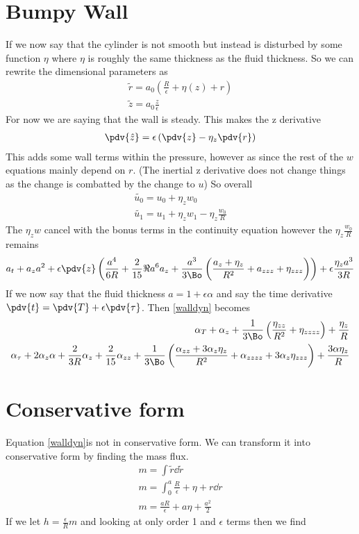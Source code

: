 \documentclass[12pt]{article}
\begin{document}
\section{Bumpy Wall}

If we now say that the cylinder is not smooth but instead is disturbed by some function $\eta$ where $\eta$ is roughly the same thickness as the fluid thickness. So we can rewrite the dimensional parameters as
\begin{align}
\tilde r = a_0\left(\frac{R}{\epsilon}+\eta(z) +r\right)\\
\tilde z = a_0\frac{ z}{\epsilon}
\end{align}
For now we are saying that the wall is steady.
This makes the z derivative
\begin{align}
\pdv{\hat{z}} = \epsilon\left(\pdv{z} - \eta_z\pdv{r}\right)
\end{align}
This adds some wall terms within the pressure, however as since the rest of the $w$ equations mainly depend on $r$. (The inertial z derivative does not change things as the change is combatted by the change to $u$)
So overall
\begin{align}
\tilde{u_0} = u_0 + \eta_z w_0 \\
\tilde{u_1} = u_1 + \eta_z w_1 - \eta_z \frac{w_0}{R}
\end{align}
The $\eta_z w$ cancel with the bonus terms in the continuity equation however the $\eta_z \frac{w_0}{R}$ remains
\begin{align}
a_t + a_z a^2  +\epsilon\pdv{z}\left(\frac{a^4}{6R}+\frac{2}{15}\Re a^6a_z+ \frac{a^3}{3\Bo}\left(\frac{a_z+\eta_z}{R^2}+a_{zzz}+\eta_{zzz}\right)\right) + \epsilon\frac{\eta_z a^3}{3R}\label{walldyn}
\end{align}
If we now say that the fluid thickness $a = 1+\epsilon\alpha$ and say the time derivative $\pdv{t} = \pdv{T} + \epsilon\pdv{\tau}$. Then \eqref{walldyn} becomes
\begin{align}
\alpha_T + \alpha_z+ \frac{1}{3\Bo}\left(\frac{\eta_{zz}}{R^2}+ \eta_{zzzz}\right)+ \frac{\eta_z}{R}\\
	\alpha_\tau + 2\alpha_z\alpha+ \frac{2}{3R}\alpha_z + \frac{2}{15}\alpha_{zz}+ \frac{1}{3\Bo}\left(\frac{\alpha_{zz}+ 3\alpha_z\eta_z}{R^2}+\alpha_{zzzz}+3\alpha_z\eta_{zzz} \right)+ \frac{3\alpha\eta_z}{R}
\end{align}

\section{Conservative form}
Equation \eqref{walldyn}is not in conservative form. We can transform it into conservative form by finding the mass flux.
\begin{align}
m = \int \tilde{r}\dd{\tilde{r}}\\
m = \int_{0}^{a}{\frac{R}{\epsilon}+\eta+r\dd{r}}\\
m = \frac{a R}{\epsilon} + a\eta+ \frac{a^2}{2}
\end{align}
If we let $h = \frac{\epsilon}{R}m$ and looking at only order 1 and $\epsilon$ terms then we find
\end{document}
